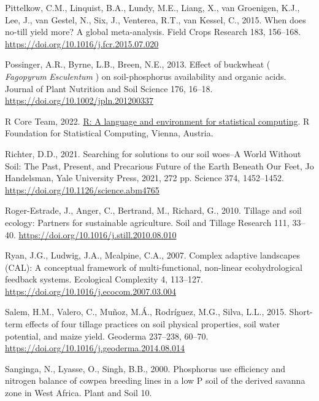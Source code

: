 \documentclass[
  12pt,
]{article}
\newlength{\cslhangindent}
\newlength{\cslentryspacingunit} %
\newenvironment{CSLReferences}[2] %
 {%
  \setlength{\parindent}{0pt}
  \ifodd #1
  \let\oldpar\par
  \def\par{\hangindent=\cslhangindent\oldpar}
  \fi
  \setlength{\parskip}{#2\cslentryspacingunit}
 }%
 {}
\begin{document}
\begin{CSLReferences}{1}{0}
\leavevmode{}%
Pittelkow, C.M., Linquist, B.A., Lundy, M.E., Liang, X., van Groenigen, K.J., Lee, J., van Gestel, N., Six, J., Venterea, R.T., van Kessel, C., 2015. When does no-till yield more? {A} global meta-analysis. Field Crops Research 183, 156--168. \url{https://doi.org/10.1016/j.fcr.2015.07.020}

\leavevmode{}%
Possinger, A.R., Byrne, L.B., Breen, N.E., 2013. Effect of buckwheat ( {\emph{Fagopyrum}}{ \emph{Esculentum}} ) on soil-phosphorus availability and organic acids. Journal of Plant Nutrition and Soil Science 176, 16--18. \url{https://doi.org/10.1002/jpln.201200337}

\leavevmode{}%
R Core Team, 2022. \href{https://www.R-project.org/}{R: A language and environment for statistical computing}. R Foundation for Statistical Computing, Vienna, Austria.

\leavevmode{}%
Richter, D.D., 2021. Searching for solutions to our soil woes--{A World Without Soil}: {The Past}, {Present}, and {Precarious Future} of the {Earth Beneath Our Feet}, {Jo Handelsman}, {Yale University Press}, 2021, 272 pp. Science 374, 1452--1452. \url{https://doi.org/10.1126/science.abm4765}

\leavevmode{}%
Roger-Estrade, J., Anger, C., Bertrand, M., Richard, G., 2010. Tillage and soil ecology: {Partners} for sustainable agriculture. Soil and Tillage Research 111, 33--40. \url{https://doi.org/10.1016/j.still.2010.08.010}

\leavevmode{}%
Ryan, J.G., Ludwig, J.A., Mcalpine, C.A., 2007. Complex adaptive landscapes ({CAL}): {A} conceptual framework of multi-functional, non-linear ecohydrological feedback systems. Ecological Complexity 4, 113--127. \url{https://doi.org/10.1016/j.ecocom.2007.03.004}

\leavevmode{}%
Salem, H.M., Valero, C., Muñoz, M.Á., Rodríguez, M.G., Silva, L.L., 2015. Short-term effects of four tillage practices on soil physical properties, soil water potential, and maize yield. Geoderma 237--238, 60--70. \url{https://doi.org/10.1016/j.geoderma.2014.08.014}

\leavevmode{}%
Sanginga, N., Lyasse, O., Singh, B.B., 2000. Phosphorus use efficiency and nitrogen balance of cowpea breeding lines in a low {P} soil of the derived savanna zone in {West Africa}. Plant and Soil 10.


\end{CSLReferences}
\end{document}
